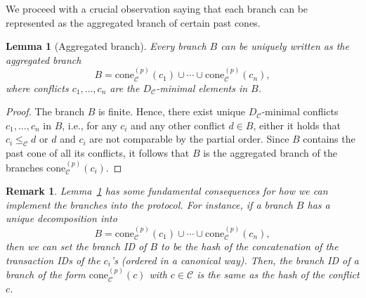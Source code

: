 \documentclass[11pt]{article}
\newcommand{\C}{\mathcal{C}}
\newcommand{\conflictset}{\mathcal{C}}
\newcommand{\ConflictDAG}{D_{\conflictset}}
\newcommand{\cone}[3]{\mathrm{cone}_{#2}^{(#1)}\left(#3\right)}
\theoremstyle{plain}
\newtheorem{lemma}{Lemma}
\newtheorem{remark}{Remark}
\theoremstyle{definition}
\numberwithin{definition}{section}
\numberwithin{lemma}{section}
\numberwithin{ass}{section}
\numberwithin{remark}{section}
\numberwithin{example}{section}
\numberwithin{proposition}{section}
\numberwithin{theorem}{section}
\begin{document}
We proceed with a crucial observation saying that each branch can be represented as the aggregated branch of certain past cones.
\begin{lemma}[Aggregated branch]\label{lem: each branch is aggregate} 
Every branch ${B}$ can be uniquely written as the aggregated branch
$$
{B}= \cone{p}{\conflictset}{c_1} \cup \cdots \cup  \cone{p}{\conflictset}{c_n},
$$
where conflicts $c_1,\ldots,c_n$ are the $\ConflictDAG$-minimal elements in ${B}$. 
\end{lemma}

\begin{proof}
The branch  ${B}$ is finite. Hence, there exist unique  $\ConflictDAG$-minimal conflicts $c_1,\dots,c_n$ in ${B}$, i.e., for any $c_i$ and any other conflict $d\in {B}$, either it holds that $c_i\le_\C d$ or $d$ and $c_i$ are not comparable by the partial order.  Since ${B}$ contains the past cone of all its conflicts, it follows that ${B}$ is the aggregated branch of the branches $\cone{p}{\conflictset}{c_i}$. 

\end{proof}
\begin{remark}
Lemma~\ref{lem: each branch is aggregate} has some fundamental consequences for how we can implement the branches into the protocol. For instance, if a branch ${B}$ has a unique decomposition into 
 $$
{B}= \cone{p}{\conflictset}{c_1} \cup \cdots \cup  \cone{p}{\conflictset}{c_n},
 $$
 then we can set the branch ID of ${B}$ to be the hash of the  concatenation of the transaction IDs of the $c_i$'s (ordered in a canonical way).  Then, the branch ID of a branch of the form $\cone{p}{\conflictset}{c}$ with $c\in\conflictset$ is the same as the hash of the conflict $c$.  
 \end{remark}
\end{document}

